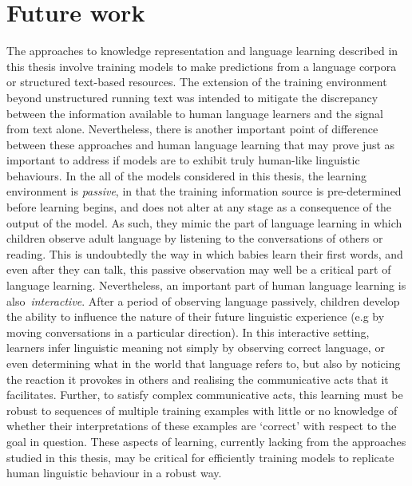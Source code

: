 \section{Future work} The approaches to knowledge representation and language learning described in this thesis involve training models to make predictions from a language corpora or structured text-based resources. The extension of the training environment beyond unstructured running text was intended to mitigate the discrepancy between the information available to human language learners and the signal from text alone. Nevertheless, there is another important point of difference between these approaches and human language learning that may prove just as important to address if models are to exhibit truly human-like linguistic behaviours. In the all of the models considered in this thesis, the learning environment is \emph{passive}, in that the training information source is pre-determined before learning begins, and does not alter at any stage as a consequence of the output of the model. As such, they mimic the part of language learning in which children observe adult language by listening to the conversations of others or reading. This is undoubtedly the way in which babies learn their first words, and even after they can talk, this passive observation may well be a critical part of language learning. Nevertheless, an important part of human language learning is also~\emph{interactive}. After a period of observing language passively, children develop the ability to influence the nature of their future linguistic experience (e.g by moving conversations in a particular direction). In this interactive setting, learners infer linguistic meaning not simply by observing correct language, or even determining what in the world that language refers to, but also by noticing the reaction it provokes in others and realising the communicative acts that it facilitates. Further, to satisfy complex communicative acts, this learning must be robust to sequences of multiple training examples with little or no knowledge of whether their interpretations of these examples are `correct' with respect to the goal in question. These aspects of learning, currently lacking from the approaches studied in this thesis, may be critical for efficiently training models to replicate human linguistic behaviour in a robust way.

